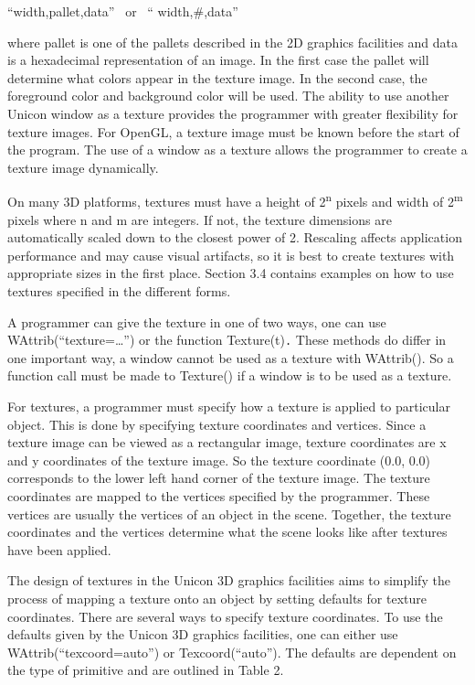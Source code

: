 \documentclass[letterpaper]{article}
\begin{document}
{\sffamily
{}``width,pallet,data'' \ \textrm{or} \ {}`` width,\#,data''}

\noindent where \textsf{pallet} is one of the pallets described in the 2D
graphics facilities and data is a hexadecimal representation of an
image. In the first case the pallet will determine what colors appear
in the texture image. In the second case, the foreground color and
background color will be used. The ability to use another Unicon
window as a texture provides the programmer with greater flexibility
for texture images. For OpenGL, a texture image must be known before
the start of the program. The use of a window as a texture allows
the programmer to create a texture image dynamically.

On many 3D platforms,
textures must have a height of 2\textsuperscript{n} pixels and width
of 2\textsuperscript{m} pixels where n and m are integers. If not, the
texture dimensions are automatically scaled down to the closest power
of 2. Rescaling affects application performance and may cause visual
artifacts, so it is best to create textures with appropriate sizes
in the first place. Section 3.4 contains examples on how to use
textures specified in the different forms.

A programmer can give the texture in one of two ways, one can use
\textsf{WAttrib(``texture={\dots}'') }or the function
\textsf{Texture(t)}\texttt{.} These methods do differ in one important
way, a window cannot be used as a texture with \textsf{WAttrib()}. So
a function call must be made to \textsf{Texture()} if a window is to
be used as a texture.

For textures, a programmer must specify how a texture is applied to
particular object. This is done by specifying texture coordinates and
vertices. Since a texture image can be viewed as a rectangular image,
texture coordinates are x and y coordinates of the texture image. So
the texture coordinate \textsf{(0.0, 0.0)} corresponds to the lower
left hand corner of the texture image. The texture coordinates are
mapped to the vertices specified by the programmer. These vertices are
usually the vertices of an object in the scene. Together, the texture
coordinates and the vertices determine what the scene looks like after
textures have been applied.

The design of textures in the Unicon 3D graphics facilities aims to
simplify the process of mapping a texture onto an object by setting
defaults for texture coordinates. There are several ways to specify
texture coordinates. To use the defaults given by the Unicon 3D
graphics facilities, one can either use
\textsf{WAttrib(``texcoord=auto'')} or
\textsf{Texcoord(``auto'')}. The defaults are dependent on the type of
primitive and are outlined in Table 2.
\end{document}
